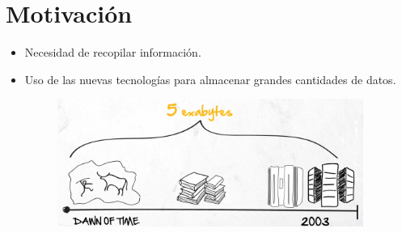 
\section{Motivación}

{
	
	\begin{frame}{}
		\begin{itemize}
			\item Necesidad de recopilar información.
			\item Uso de las nuevas tecnologías para almacenar grandes cantidades de datos.		
				
			\begin{figure}[H]
				\centering
				\includegraphics[width=10cm]{./Images/data.png}
			\end{figure}
		\end{itemize}
	\end{frame}
}
			

